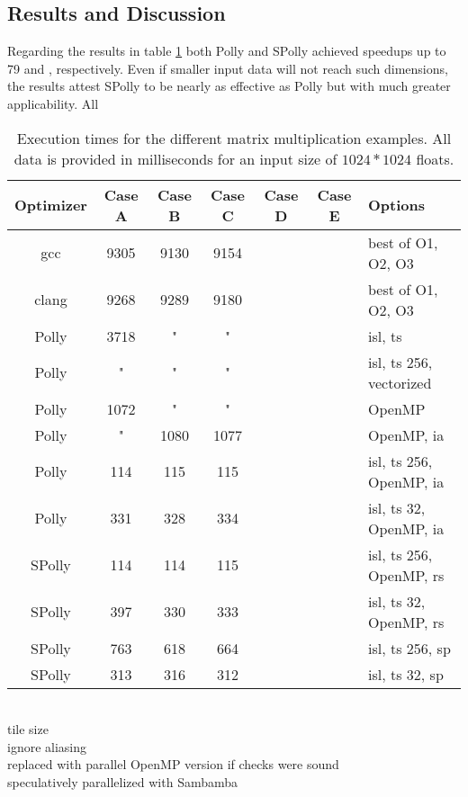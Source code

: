 \subsection*{Results and Discussion}
Regarding the results in table \ref{tab:CaseStudyResults} both Polly and SPolly 
achieved speedups up to 79 and , respectively. 
Even if smaller input data will not reach such dimensions, the results
attest SPolly to be nearly as effective as Polly but with much greater
applicability. All 


\begin{table}[htpb]
  \caption{Execution times for the different matrix multiplication examples. 
  All data is provided in milliseconds for an input size of $1024 * 1024$ floats.}
  \label{tab:CaseStudyResults}
  \begin{tabularx}{\textwidth}{| c | c | c | c | c | c | X |}
    \hline
    Optimizer & Case A & Case B & Case C & Case D & Case E & Options \\
    \hline
    \hline
    gcc     & 9305 & 9130  & 9154 &     &    &  best of O1, O2, O3   \\ 
    clang   & 9268 & 9289  & 9180 &     &    &  best of O1, O2, O3   \\ 
    Polly   & 3718 & "     & "    &     &    &  isl, ts\footnotemark[1]  256  \\  
    Polly   &  "   & "     & "    &     &    &  isl, ts 256, vectorized  \\  
    Polly   & 1072 & "     & "    &     &    &  OpenMP  \\  
    Polly   &  "   &  1080 & 1077 &     &    &  OpenMP, ia\footnotemark[2]  \\  
    Polly   &  114 &  115  & 115  &     &    &  isl, ts 256, OpenMP, ia   \\  
    Polly   &  331 &  328  & 334  &     &    &  isl, ts 32,  OpenMP, ia  \\  
    SPolly  &  114 &  114  & 115  &     &    &  isl, ts 256,  OpenMP, rs\footnotemark[3]  \\  
    SPolly  &  397 &  330  & 333  &     &    &  isl, ts 32,  OpenMP, rs  \\  
    SPolly  &  763 &  618  & 664  &     &    & isl, ts 256, sp\footnotemark[4] \\  
    SPolly  &  313 &  316  & 312  &     &    & isl, ts  32, sp \\  
    \hline
  \end{tabularx}
  ~\\
  \footnotemark[1] tile size \\
  \footnotemark[2] ignore aliasing \\
  \footnotemark[3] replaced with parallel OpenMP version if checks were sound  \\
  \footnotemark[4] speculatively parallelized with Sambamba \\
\end{table}



